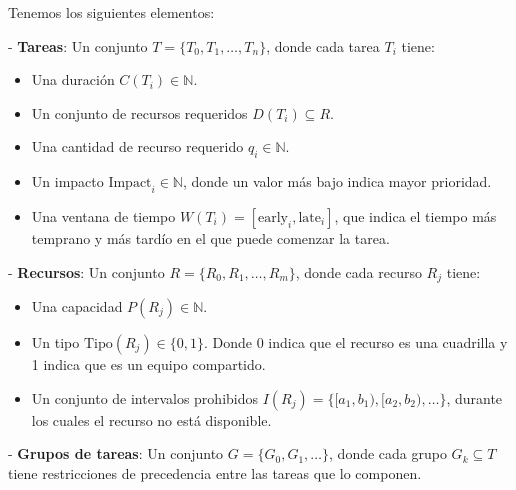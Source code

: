 \documentclass{article}
\begin{document}
Tenemos los siguientes elementos:

- \textbf{Tareas}: Un conjunto \( T = \{T_0, T_1, \dots, T_n\} \), donde cada tarea \( T_i \) tiene:
  \begin{itemize}
    \item Una duración \( C(T_i) \in \mathbb{N} \).
    \item Un conjunto de recursos requeridos \( D(T_i) \subseteq R \).
    \item Una cantidad de recurso requerido \( q_i \in \mathbb{N} \).
    \item Un impacto \( \text{Impact}_i \in \mathbb{N} \), donde un valor más bajo indica mayor prioridad.
    \item Una ventana de tiempo \( W(T_i) = [\text{early}_i, \text{late}_i] \), que indica el tiempo más temprano y más tardío en el que puede comenzar la tarea.
  \end{itemize}

- \textbf{Recursos}: Un conjunto \( R = \{R_0, R_1, \dots, R_m\} \), donde cada recurso \( R_j \) tiene:
  \begin{itemize}
    \item Una capacidad \( P(R_j) \in \mathbb{N} \).
    \item Un tipo \( \text{Tipo}(R_j) \in \{0, 1\} \). Donde 0 indica que el recurso es una cuadrilla y 1 indica que es un equipo compartido.
    \item Un conjunto de intervalos prohibidos \( I(R_j) = \{[a_1, b_1), [a_2, b_2), \dots\} \), durante los cuales el recurso no está disponible.
  \end{itemize}

- \textbf{Grupos de tareas}: Un conjunto \( G = \{G_0, G_1, \dots\} \), donde cada grupo \( G_k \subseteq T \) tiene restricciones de precedencia entre las tareas que lo componen.

\vspace{0.5cm}
\end{document}
